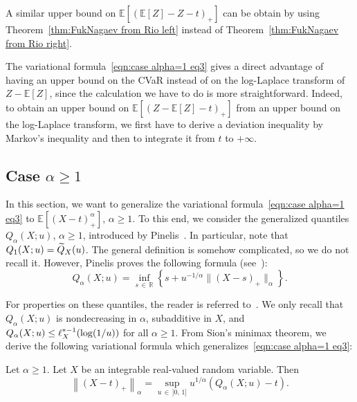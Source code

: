 \documentclass[AHL,Unicode,longabstracts,published]{cedram}
\newcommand{\bE}{\mathbb{E}}
\newcommand{\bR}{\mathbb{R}}
\let\oldtilde\tilde
\renewcommand*{\tilde}[1]{\mathchoice{\widetilde{#1}}{\widetilde{#1}}{\oldtilde{#1}}{\oldtilde{#1}}}
\begin{document}
\begin{rema}
A similar upper bound on $\bE[(\bE[Z]-Z-t)_+]$ can be obtain by using Theorem~\ref{thm:FukNagaev from Rio left} instead of Theorem~\ref{thm:FukNagaev from Rio right}.
\end{rema}

The variational formula~\eqref{eqn:case alpha=1 eq3} gives a direct advantage of having an upper bound on the CVaR instead of on the log-Laplace transform of $Z-\bE[Z]$, since the calculation we have to do is more straightforward. Indeed, to obtain an upper bound on $\bE[(Z-\bE[Z]-t)_+]$ from an upper bound on the log-Laplace transform, we first have to derive a deviation inequality by Markov's inequality and then to integrate it from $t$ to $+\infty$.

\subsection{Case \texorpdfstring{$\alpha\geq1$}{}} In this section, we want to generalize the variational formula~\eqref{eqn:case alpha=1 eq3} to $\bE[(X-t)_+^\alpha]$, $\alpha\geq 1$. To this end, we consider the generalized quantiles $Q_\alpha(X;u)$, $\alpha\geq 1$, introduced by Pinelis~\cite[Section~3]{Pinelis14b}. In particular, note that $Q_1(X;u)=\tilde Q_X(u)$. The general definition is somehow complicated, so we do not recall it. However, Pinelis proves the following formula (see~\cite[Theorem~3.3]{Pinelis14b}):
\begin{equation}\label{eqn:def generalized quantiles}
Q_\alpha(X;u)=\inf_{s\,\in\,\bR}\left\{s+u^{-1/\alpha}\|(X-s)_+\|_\alpha\right\}.
\end{equation}


For properties on these quantiles, the reader is referred to~\cite[Theorem~3.4]{Pinelis14b}. We only recall that $Q_\alpha(X;u)$ is nondecreasing in $\alpha$, subadditive in $X$, and $Q_\alpha(X;u)\linebreak\leq \ell^{*-1}_X(\log(1/u))$ for all $\alpha\geq 1$. From Sion's minimax theorem, we derive the following variational formula which generalizes~\eqref{eqn:case alpha=1 eq3}:

\begin{lemm}\label{lem:variational formula generalized moments}
Let $\alpha\geq 1$. Let $X$ be an integrable real-valued random variable. Then
\[
\left\|(X-t)_+\right\|_\alpha= \sup_{u\,\in\,]0,\,1]}u^{1/\alpha}\left(Q_\alpha(X;u)-t\right).
\]
\end{lemm}
\end{document}
